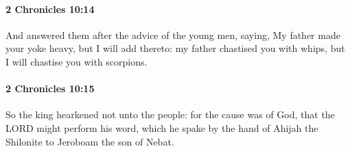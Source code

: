 		\paragraph{2 Chronicles 10:14} %
			\label{2CHRONICLES-10-14}

			And answered them after the advice of the young men, saying, My father made your yoke heavy, but I will add thereto: my father chastised you with whips, but I will chastise you with scorpions.


		\paragraph{2 Chronicles 10:15} %
			\label{2CHRONICLES-10-15}

			So the king hearkened not unto the people: for the cause was of God, that the LORD might perform his word, which he spake by the hand of Ahijah the Shilonite to Jeroboam the son of Nebat.

